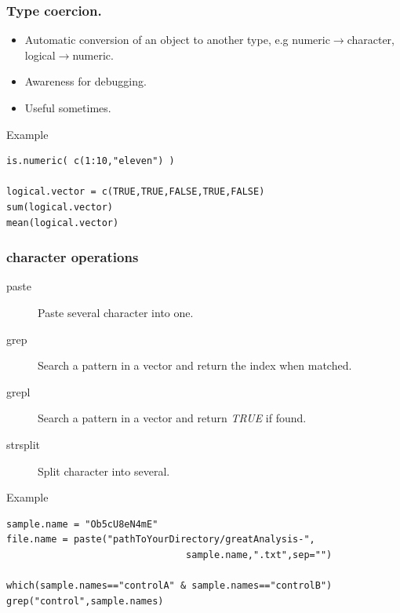 \documentclass[10pt]{beamer}
\newenvironment{xframe}[2][]
  {\begin{frame}[fragile,environment=xframe,#1]
  \frametitle{#2}}
  {\end{frame}}
\begin{document}
\begin{xframe}{Type coercion.}
  \begin{block}{}
    \begin{itemize}
    \item Automatic conversion of an object to another type, e.g {\sf numeric}$\rightarrow${\sf character}, {\sf logical}$\rightarrow${\sf numeric}.
    \item Awareness for debugging.
    \item Useful sometimes.
    \end{itemize}
  \end{block}
  \begin{exampleblock}{Example}
\begin{verbatim}
is.numeric( c(1:10,"eleven") )

logical.vector = c(TRUE,TRUE,FALSE,TRUE,FALSE)
sum(logical.vector)
mean(logical.vector)
\end{verbatim}  
  \end{exampleblock}
\end{xframe}


\begin{xframe}{{\sf character} operations}
  \begin{block}{}
    \begin{description}
      \item[paste] Paste several character into one.
      \item[grep] Search a pattern in a vector and return the index when matched.
      \item[grepl] Search a pattern in a vector and return {\it TRUE} if found.
      \item[strsplit] Split character into several.
    \end{description}
  \end{block}
  \begin{exampleblock}{Example}
\begin{verbatim}
sample.name = "Ob5cU8eN4mE"
file.name = paste("pathToYourDirectory/greatAnalysis-",
                                sample.name,".txt",sep="")

which(sample.names=="controlA" & sample.names=="controlB")
grep("control",sample.names)
\end{verbatim}  
  \end{exampleblock}
\end{xframe}
\end{document}
